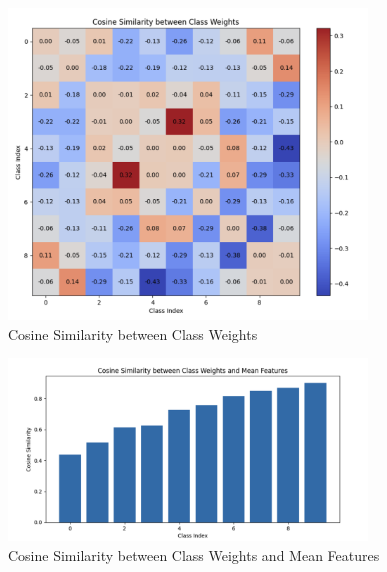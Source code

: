 \documentclass{article}
\begin{document}
\begin{figure}[h!]
\centering
\includegraphics[width=0.85\textwidth]{Plot/VS_res50/cos_res50.png}
\caption{Cosine Similarity between Class Weights}
\end{figure}
\hfill
\begin{figure}[h!]
\centering
\includegraphics[width=0.85\textwidth]{Plot/VS_res50/Wi_Hi_res50.png}
\caption{Cosine Similarity between Class Weights and Mean Features}
\end{figure}

\newpage
\end{document}
